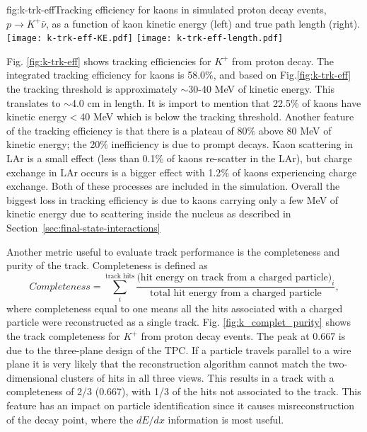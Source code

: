 \begin{dunefigure}{fig:k-trk-eff}{Tracking efficiency for kaons in simulated proton decay events, $p\rightarrow K^{+} \bar{\nu}$, as a function of kaon kinetic energy (left) and true path length (right).}
\texttt{[image: k-trk-eff-KE.pdf]}
\texttt{[image: k-trk-eff-length.pdf]}
\end{dunefigure}

Fig. \ref{fig:k-trk-eff} shows tracking efficiencies for $K^{+}$  from proton decay. The integrated tracking efficiency for kaons is 58.0$\%$, and based on Fig.\ref{fig:k-trk-eff} the tracking threshold is approximately $\sim$30-40 MeV of kinetic energy. This translates to $\sim$4.0 cm in length. It is import to mention that 22.5$\%$ of kaons have kinetic energy$<$40 MeV which is below the tracking threshold. Another feature of the tracking efficiency is that there is a plateau of $80\%$ above 80 MeV of kinetic energy; the 20$\%$ inefficiency is due to prompt decays. Kaon scattering in LAr is a small effect (less than 0.1$\%$ of kaons re-scatter in the LAr), but charge exchange in LAr occurs is a bigger effect with 1.2$\%$ of kaons experiencing charge exchange. Both of these processes are included in the simulation.  Overall the biggest loss in tracking efficiency is due to kaons carrying only a few MeV of kinetic energy due to scattering inside the nucleus as described in Section~\ref{sec:final-state-interactions}

Another metric useful to evaluate track performance is the completeness and purity of the track. Completeness is defined as
 \begin{equation}
Completeness = \sum_{i}^{\mbox{track hits}}\frac{\mbox{(hit energy on track from a charged particle)}_{i}}{\mbox{total hit energy from a charged particle}},
\end{equation}
where completeness equal to one means all the hits associated with a charged particle were reconstructed as a single track. 
Fig. \ref{fig:k_complet_purity} shows the track completeness for $K^{+}$ from proton decay events. The peak at 0.667 is due to the three-plane design of the TPC.  If a particle travels parallel to a wire plane it is very likely that the reconstruction algorithm cannot match the two-dimensional clusters of hits in all three views.  This results in a track with a completeness of 2/3 (0.667), with 1/3 of the hits not associated to the track.  This feature has an impact on particle identification since it causes misreconstruction of the decay point, where the $dE/dx$ information is most useful.

